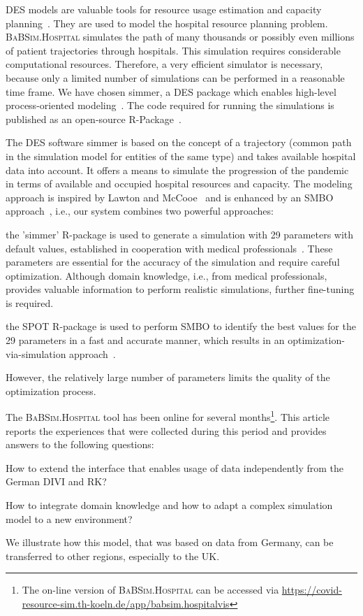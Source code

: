 \documentclass[conference]{IEEEtran}
\newcommand{\babsimhospital}{\textsc{BaBSim.Hospital}\xspace}
\renewenvironment{description}[0]{\begin{compactdesc}}{\end{compactdesc}}
\begin{document}
\gls{DES} models are valuable tools for resource usage estimation and capacity planning~\cite{Bank01a}.
They are used to model the hospital resource planning problem. 
\babsimhospital simulates the path of many thousands or possibly even millions of patient trajectories through hospitals.
This simulation requires considerable computational resources.
Therefore, a very efficient simulator is necessary, because only a limited number of simulations can be performed in a reasonable time frame.
We have chosen \gls{simmer}, a \gls{DES} package which enables high-level process-oriented modeling~\cite{Ucar19a}. 
The code required for running the simulations is published as an open-source R-Package~\cite{bart20rArxiv,bart20t}.

The \gls{DES} software \gls{simmer} is based on the concept of a trajectory (common path in the simulation model for entities of the same type) and takes available hospital data into account. It offers a means to simulate the progression of the pandemic in terms of available and occupied hospital resources and capacity. 
The modeling approach is inspired by Lawton and McCooe~\cite{Lawt19a} and is enhanced by an \gls{SMBO} approach~\cite{Forr08a}, i.e., our system combines two  powerful approaches: 
\begin{description}
    \item[Discrete event simulation:] the 'simmer' R-package is used to generate a simulation with 29 parameters with default values, established in cooperation with medical professionals~\cite{Ucar19a}. These parameters are essential for the accuracy of the simulation and require careful optimization. Although domain knowledge, i.e., from medical professionals, provides valuable information to perform realistic simulations, further fine-tuning is required.
    \item [Model-based optimization:] the  \gls{SPOT} R-package is used to perform  \gls{SMBO} to identify the best values for the 29 parameters in a fast and accurate manner, which results in an optimization-via-simulation approach~\cite{Fu94a}.
\end{description}
However, the relatively large number of parameters limits the quality of the optimization process. 

The \babsimhospital tool has been online for several months\footnote{The on-line version of \babsimhospital can be accessed via \url{https://covid-resource-sim.th-koeln.de/app/babsim.hospitalvis}}. 
This article reports the experiences that were collected during this period and provides answers to the following questions:
\begin{compactenum}[(Q-1)]
\item How to extend the interface that enables  usage  of  data  independently  from  the German DIVI  and  RK?
\item How to integrate domain knowledge and how to adapt a complex simulation model to a new environment?
\end{compactenum}
We illustrate how this model, that was based on data from Germany, can be transferred to other regions, especially to the UK. 
\end{document}
